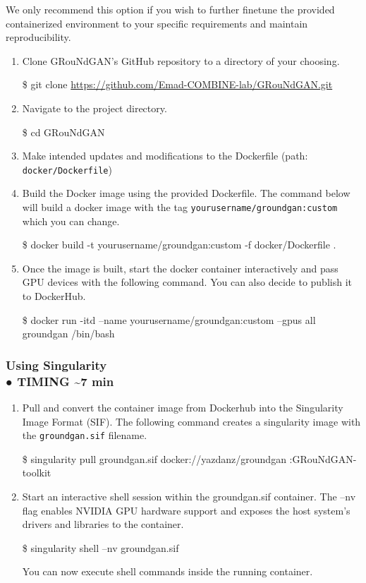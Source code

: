 We only recommend this option if you wish to further finetune the provided containerized
environment to your specific requirements and maintain reproducibility. 
\begin{enumerate}
	\item Clone GRouNdGAN’s GitHub repository to a directory of your choosing.
\begin{codeblock}
\$ git clone \url{https://github.com/Emad-COMBINE-lab/GRouNdGAN.git}
\end{codeblock} 
	\item Navigate to the project directory.
\begin{codeblock}
\$ cd GRouNdGAN
\end{codeblock} 
	\item Make intended updates and modifications to the Dockerfile (path: \texttt{docker/Dockerfile}) 
	\item Build the Docker image using the provided Dockerfile. The command below will build a docker
image with the tag \texttt{yourusername/groundgan:custom} which you can change.
\begin{codeblock}
\$ docker build -t yourusername/groundgan:custom -f docker/Dockerfile .
\end{codeblock} 
\item Once the image is built, start the docker container interactively and pass GPU devices with the
following command. You can also decide to publish it to DockerHub.
\begin{codeblock}
\$ docker run -itd --name yourusername/groundgan:custom --gpus all
groundgan /bin/bash
\end{codeblock} 
\end{enumerate}
\subsubsection*{Using Singularity \\ ● TIMING \textasciitilde 7 min}
\begin{enumerate}
	\item Pull and convert the container image from Dockerhub into the Singularity Image Format (SIF).
The following command creates a singularity image with the \texttt{groundgan.sif} filename.
\begin{codeblock}
\$ singularity pull groundgan.sif docker://yazdanz/groundgan
:GRouNdGAN-toolkit
\end{codeblock}
	\item Start an interactive shell session within the groundgan.sif container. The --nv flag enables
NVIDIA GPU hardware support and exposes the host system’s drivers and libraries to the
container.  
\begin{codeblock}
\$ singularity shell --nv groundgan.sif
\end{codeblock}
You can now execute shell commands inside the running container. 
\end{enumerate}

